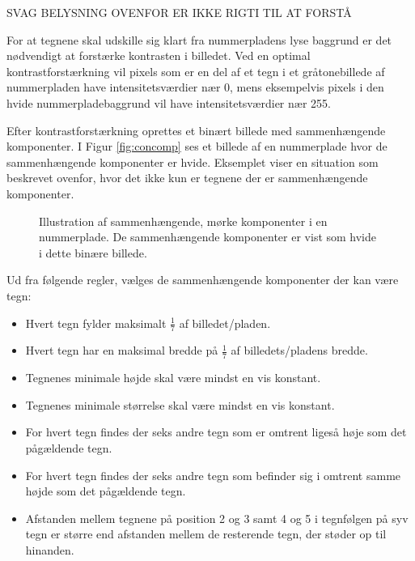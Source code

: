 SVAG BELYSNING OVENFOR ER IKKE RIGTI TIL AT FORSTÅ

For at tegnene skal udskille sig klart fra nummerpladens lyse baggrund er det nødvendigt at forstærke kontrasten i billedet. Ved en optimal kontrastforstærkning vil pixels som er en del af et tegn i et gråtonebillede af nummerpladen have intensitetsværdier nær 0, mens eksempelvis pixels i den hvide nummerpladebaggrund vil have intensitetsværdier nær 255.



Efter kontrastforstærkning oprettes et binært billede med sammenhængende komponenter. I Figur \vref{fig:concomp} ses et billede af en nummerplade hvor de sammenhængende komponenter er hvide. Eksemplet viser en situation som beskrevet ovenfor, hvor det ikke kun er tegnene der er sammenhængende komponenter.

\begin{figure}[htp]
  \centering
  \caption{Illustration af sammenhængende, mørke komponenter i en nummerplade. De sammenhængende komponenter er vist som hvide i dette binære billede.}
  \label{fig:concomp}
\end{figure}

Ud fra følgende regler, vælges de sammenhængende komponenter der kan være tegn:

\begin{itemize}
\item Hvert tegn fylder maksimalt $\frac{1}{7}$ af billedet/pladen.
\item Hvert tegn har en maksimal bredde på $\frac{1}{7}$ af billedets/pladens bredde.
\item Tegnenes minimale højde skal være mindst en vis konstant.%
\item Tegnenes minimale størrelse skal være mindst en vis konstant.%
\item For hvert tegn findes der seks andre tegn som er omtrent ligeså høje som det pågældende tegn.
\item For hvert tegn findes der seks andre tegn som befinder sig i omtrent samme højde som det pågældende tegn.
\item Afstanden mellem tegnene på position 2 og 3 samt 4 og 5 i tegnfølgen på syv tegn er større end afstanden mellem de resterende tegn, der støder op til hinanden.
\end{itemize}

